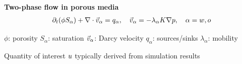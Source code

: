 \begin{frame}{\name{}}
    \setlength{\cw}{0.6\textwidth}%
    \def\dx{1.5em}%
    \begin{overlayarea}{\textwidth}{\frameheight}
        \vspace{1em}%
        \textbf{Two-phase flow in porous media}
        \begin{align*}
            \partial_t(\phi S_\alpha) + \nabla \cdot \vec v_\alpha = q_\alpha, \quad  \vec v_\alpha = -\lambda_\alpha K\nabla p, \quad \alpha = w, o
        \end{align*}
        \vspace{-1.7em}
        \begin{block}{}
            \small
            \begin{center}
                $\phi$: porosity \hspace{\dx} $S_\alpha$: saturation \hspace{\dx} $\vec v_\alpha$: Darcy velocity \hspace{\dx} $q_\alpha$: sources/sinks \hspace{\dx} $\lambda_\alpha$: mobility
            \end{center}
        \end{block}
        \vspace{0.3em}
        \begin{squarelist}
            \item<2-> Quantity of interest $u$ typically derived from simulation results
        \end{squarelist}
        \vspace{0.5em}
    \end{overlayarea}
\end{frame}


